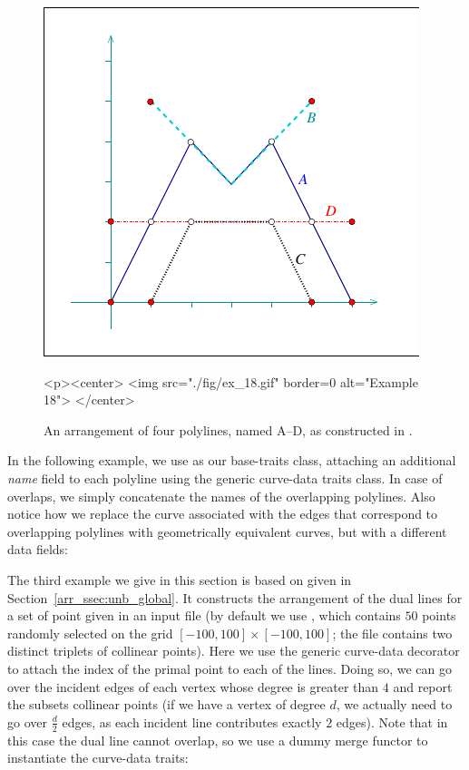 
\begin{figure}[t]
\begin{ccTexOnly}
  \begin{center}
  \includegraphics{Arrangement_2/fig/ex_18}
  \end{center}
\end{ccTexOnly}
\begin{ccHtmlOnly}
  <p><center>
  <img src="./fig/ex_18.gif" border=0 alt="Example 18">
  </center>
\end{ccHtmlOnly}
\caption{An arrangement of four polylines, named A--D, as
constructed in .\label{arr_fig:ex_18}}
\end{figure}

In the following example, we use  as
our base-traits class, attaching an additional {\em name} field to
each polyline using the generic curve-data traits class. In case of
overlaps, we simply concatenate the names of the overlapping
polylines. Also notice how we replace the curve associated with
the edges that correspond to overlapping polylines with 
geometrically equivalent curves, but with a different data fields:


The third example we give in this section is based on 
given in Section~\ref{arr_ssec:unb_global}. It constructs the arrangement
of the dual lines for a set of point given in an input file (by default we
use , which contains $50$ points randomly selected
on the grid $[-100,100]\times[-100,100]$; the file contains two distinct
triplets of collinear points). Here we use the generic curve-data
decorator to attach the index of the primal point to each of the lines.
Doing so, we can go over the incident edges of each vertex whose degree is
greater than $4$ and report the subsets collinear points (if we have a vertex
of degree $d$, we actually need to go over $\frac{d}{2}$ edges, as each
incident line contributes exactly $2$ edges). Note that in this case the
dual line cannot overlap, so we use a dummy merge functor to instantiate
the curve-data traits:

